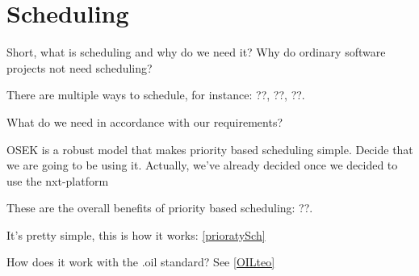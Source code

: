\section{Scheduling} \label{analysis:scheduling} 

Short, what is scheduling and why do we need it? Why do ordinary software projects not need scheduling?

There are multiple ways to schedule, for instance: ??, ??, ??.

What do we need in accordance with our requirements? 

OSEK is a robust model that makes priority based scheduling simple. Decide that we are going to be using it. Actually, we've already decided once we decided to use the nxt-platform

These are the overall benefits of priority based scheduling: ??.

It's pretty simple, this is how it works: \ref{prioratySch}

How does it work with the .oil standard? See \ref{OILteo}